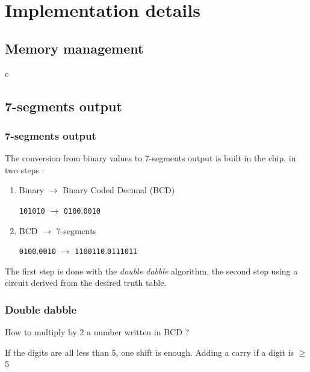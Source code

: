 \documentclass[slidestop]{beamer}
\begin{document}
\section{Implementation details}

\subsection{Memory management}

\begin{frame}
e
\end{frame}

\subsection{7-segments output}

\begin{frame}
\frametitle{7-segments output}
The conversion from binary values to 7-segments output is built in the chip, in two steps :
\begin{enumerate}
    \item Binary $\rightarrow$ Binary Coded Decimal (BCD)
        
          \texttt{101010} $\rightarrow$ \texttt{0100}.\texttt{0010}
    \item BCD $\rightarrow$ 7-segments

        \texttt{0100}.\texttt{0010} $\rightarrow$ \texttt{1100110}.\texttt{0111011}
\end{enumerate}

The first step is done with the \emph{double dabble} algorithm, the second step using a circuit derived
from the desired truth table.

\end{frame}

\begin{frame}
    \frametitle{Double dabble}

    How to multiply by 2 a number written in BCD ?

    If the digits are all less than 5, one shift is enough.
    Adding a carry if a digit is $\geq$ 5
\end{frame}
\end{document}
